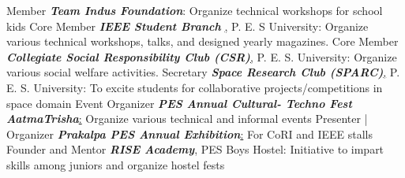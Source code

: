 	\begin{cvskills}
	\cvskill
		{Member}
		{\textit{\textbf{Team Indus Foundation}}: Organize technical workshops for school kids}
	\cvskill
		{Core Member}
		{\textit{\textbf{IEEE Student Branch }}\href{http://ieee.pes.edu/}, P. E. S University: Organize various technical workshops, talks, and designed yearly magazines.}
	\cvskill
		{Core Member}
		{\textit{\textbf{Collegiate Social Responsibility Club (CSR)}}\href{http://pes.edu/clubs/pes-csr-club/}, P. E. S. University: Organize various social welfare activities.}
	\cvskill
		{Secretary}
		{\textit{\textbf{Space Research Club (SPARC)}}\href{https://www.facebook.com/Space-Research-Club-Of-PES-University-487153011445398/?tn-str=k*F}, P. E. S. University: To excite students for collaborative projects/competitions in space domain}
	\cvskill
		{Event Organizer}
		{\textit{\textbf{PES Annual Cultural- Techno Fest AatmaTrisha}}\href{http://pes.edu/clubs/atmatrisha/}: Organize various technical and informal events}
	\cvskill
		{Presenter | Organizer}
		{\textit{\textbf{Prakalpa PES Annual Exhibition}}\href{http://pes.edu/clubs/prakalpa/}: For CoRI and IEEE stalls}
	\cvskill
		{Founder and Mentor}
		{\textit{\textbf{RISE Academy}}, PES Boys Hostel: Initiative to impart skills among juniors and organize hostel fests}
\end{cvskills}
